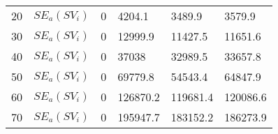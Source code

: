 \begin{table}[H]
\begin{tabular}{l l | l l | l l}
		20                                                          & $SE_{a}(SV_i)$                                                    & 0                                                                &     4204.1                                                               & 3489.9                                                           & 3579.9                                                                  \\
		30                                                          & $SE_{a}(SV_i)$                                                    & 0                                                                &   12999.9                                                                & 11427.5                                                          & 11651.6                                                                 \\
		40                                                          & $SE_{a}(SV_i)$                                                    & 0                                                                &     37038                                                            & 32989.5                                                          & 33657.8                                                                 \\
		50                                                          & $SE_{a}(SV_i)$                                                    & 0                                                                &     69779.8                                                                & 54543.4                                                          & 64847.9                                                                 \\
		60                                                          & $SE_{a}(SV_i)$                                                    & 0                                                                &    126870.2                                                              & 119681.4                                                         & 120086.6                                                                \\
		70                                                          & $SE_{a}(SV_i)$                                                    & 0                                                                &    195947.7                                                           & 183152.2                                                         & 186273.9                                                                \\

\end{tabular}
\end{table}
